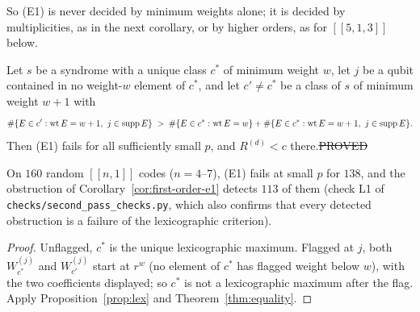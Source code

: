 \noindent So (E1) is never decided by minimum weights alone; it is decided by multiplicities, as in the next corollary, or by higher orders, as for $[[5,1,3]]$ below.

\begin{corollary}\label{cor:first-order-e1}
Let $s$ be a syndrome with a unique class $c^\ast$ of minimum weight $w$, let $j$ be a qubit contained in no weight-$w$ element of $c^\ast$, and let $c'\ne c^\ast$ be a class of $s$ of minimum weight $w+1$ with
\[
\#\{E\in c':\wt E=w+1,\ j\in\supp E\}\;>\;\#\{E\in c^\ast:\wt E=w\}+\#\{E\in c^\ast:\wt E=w+1,\ j\in\supp E\}.
\]
Then (E1) fails for all sufficiently small $p$, and $R^{(d)}<c$ there.\hfill\st{PROVED}
\end{corollary}
\noindent On $160$ random $[[n,1]]$ codes ($n=4$--$7$), (E1) fails at small $p$ for $138$, and the obstruction of Corollary~\ref{cor:first-order-e1} detects $113$ of them (check L1 of \texttt{checks/second\_pass\_checks.py}, which also confirms that every detected obstruction is a failure of the lexicographic criterion).
\begin{proof}
Unflagged, $c^\ast$ is the unique lexicographic maximum. Flagged at $j$, both $W^{(j)}_{c^\ast}$ and $W^{(j)}_{c'}$ start at $r^w$ (no element of $c^\ast$ has flagged weight below $w$), with the two coefficients displayed; so $c^\ast$ is not a lexicographic maximum after the flag. Apply Proposition~\ref{prop:lex} and Theorem~\ref{thm:equality}.
\end{proof}

